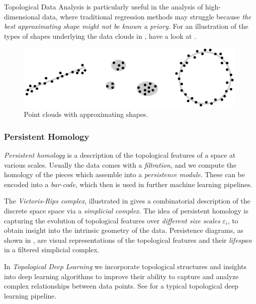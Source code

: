 \documentclass[11pt, a4paper]{amsart}
\begin{document}
Topological Data Analysis is particularly useful in the analysis of high-dimensional data, where traditional regression methods may struggle because \emph{the best approximating shape might not be known a priory.}
For an illustration of the types of shapes underlying the data clouds in , have a look at .

\begin{figure}
	\centering
	\includegraphics[width=0.95\linewidth]{figures/topological_data_analysis/topological_data_analysis_collection_with_shapes}
	\caption{
		Point clouds with approximating shapes.
		\label{fig:topological_data_analysis_collection_with_shapes}
	}
\end{figure}

\subsubsection{Persistent Homology}

\emph{Persistent homology} is a description of the topological features of a space at various scales.
Usually the data comes with a \emph{filtration}, and we compute the homology of the pieces which assemble into a \emph{persistence module}.
These can be encoded into a \emph{bar-code}, which then is used in further machine learning pipelines.

The \emph{Vietoris-Rips complex}, illustrated in  gives a combinatorial description of the discrete space space via a \emph{simplicial complex}.
The idea of persistent homology is capturing the evolution of topological features over \emph{different size scales} $\varepsilon_{i}$, to obtain insight into the intrinsic geometry of the data.
Persistence diagrams, as shown in , are visual representations of the topological features and their \emph{lifespan} in a filtered simplicial complex.

In \emph{Topological Deep Learning} we incorporate topological structures and insights into deep learning algorithms to improve their ability to capture and analyze complex relationships between data points. See  for a typical topological deep learning pipeline.
\end{document}
